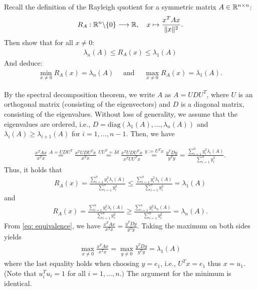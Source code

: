 \documentclass{ExerciseSheet}
\newif\ifsolutions
\begin{document}


\begin{problem}
Recall the definition of the Rayleigh quotient for a symmetric matrix $A\in \mathbb{R}^{n \times n}$:
\begin{equation*}
    R_A: \mathbb{R}^n\backslash \{0\} \longrightarrow \mathbb{R}, \quad x \mapsto  \frac{x^T A x}{\|x\|^2}.
\end{equation*}
Then show that for all $ x\neq 0$:
\begin{align*}
    \lambda_n(A) \leq R_A(x) \leq \lambda_1(A)
\end{align*}
And deduce: 
\begin{align*}
    \min_{x\neq 0} R_A(x)=\lambda_n(A)\quad \text{ and }\quad \max_{x\neq 0} R_A(x)=\lambda_1(A).
\end{align*}
\end{problem}

\ifsolutions
\vskip 0.3cm

\begin{solution}
By the spectral decomposition theorem, we write $A$ as $A=UDU^T$, where $U$ is an orthogonal matrix (consisting of the eigenvectors) and $D$ is a diagonal matrix, consisting of the eigenvalues. Without loss of generality, we assume that the eigenvalues are ordered, i.e., $D=\text{diag}(\lambda_1(A), ..., \lambda_n(A))$ and $\lambda_i(A) \geq \lambda_{i+1}(A)$ for $i=1,...,n-1$. Then, we have

\begin{align}
    \frac{x^TA x}{x^Tx} \overset{A=UDU^T}{=} \frac{x^TUDU^Tx}{x^Tx}\overset{UU^T=Id}{=} \frac{x^TUDU^Tx}{x^TUU^Tx} \overset{y:=U^Tx}{=} \frac{y^TDy}{y^Ty} = \frac{\sum_{i=1}^n y_i^2 \lambda_i(A)} {\sum_{i=1}^n y_i^2}\label{eq: equivalence} .
\end{align}
Thus, it holds that
\begin{align*}
    R_A(x)=\frac{\sum_{i=1}^n y_i^2 \lambda_i(A)} {\sum_{i=1}^n y_i^2}  \leq \frac{\sum_{i=1}^n y_i^2 \lambda_1(A)}{\sum_{i=1}^n y_i^2}=\lambda_1(A)
\end{align*}
and 
\begin{align*}
    R_A(x)=\frac{\sum_{i=1}^n y_i^2 \lambda_i(A)} {\sum_{i=1}^n y_i^2}  \geq \frac{\sum_{i=1}^n y_i^2 \lambda_n(A)}{\sum_{i=1}^n y_i^2}=\lambda_n(A).
\end{align*}
From \eqref{eq: equivalence}, we have $\frac{x^TA x}{x^Tx} =\frac{y^TDy}{y^Ty}$. Taking the maximum on both sides yields
\begin{align*}
    \max_{x\not=0} \frac{x^TA x}{x^Tx} =\max_{y\not=0} \frac{y^TDy}{y^Ty}=\lambda_1(A)
\end{align*}
where the last equality holds when choosing $y=e_1$, i.e., $U^Tx=e_1$ thus $x=u_1$. (Note that $u_i^Tu_i=1$ for all $i=1,\ldots,n.)$ The argument for the minimum is identical.
\end{solution}
\end{document}
